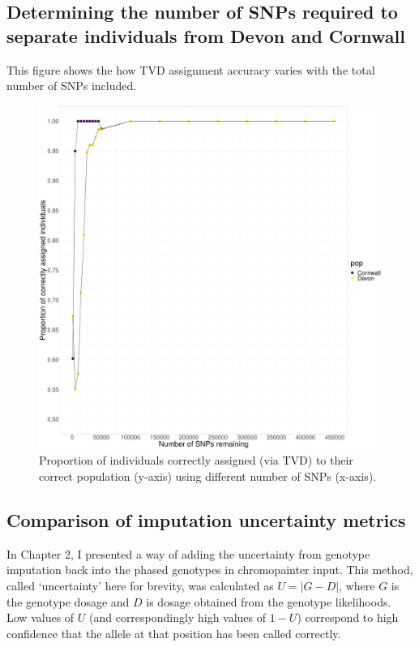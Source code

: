 \subsection{Determining the number of SNPs required to separate individuals from Devon and Cornwall} 
\label{sec:SNP_Count_Assignment_DevCorn}

This figure shows the how TVD assignment accuracy varies with the total number of SNPs included.


\begin{figure}[htp]
    \centering
    \includegraphics[width=1.0\textwidth]{../images/appendix/Devon_Cornwall_TVD_reduced.pdf}
    \caption{Proportion of individuals correctly assigned (via TVD) to their correct population (y-axis) using different number of SNPs (x-axis).}
    \label{fig:Devon_Cornwall_TVD_reduced_assignment}
\end{figure}

\subsection{Comparison of imputation uncertainty metrics} \label{sec:alt_input_score_test}

In Chapter 2, I presented a way of adding the uncertainty from genotype imputation back into the phased genotypes in chromopainter input. This method, called `uncertainty' here for brevity, was calculated as $U = |G-D|$, where $G$ is the genotype dosage and $D$ is dosage obtained from the genotype likelihoods. Low values of $U$ (and correspondingly high values of $1-U$) correspond to high confidence that the allele at that position has been called correctly. 


